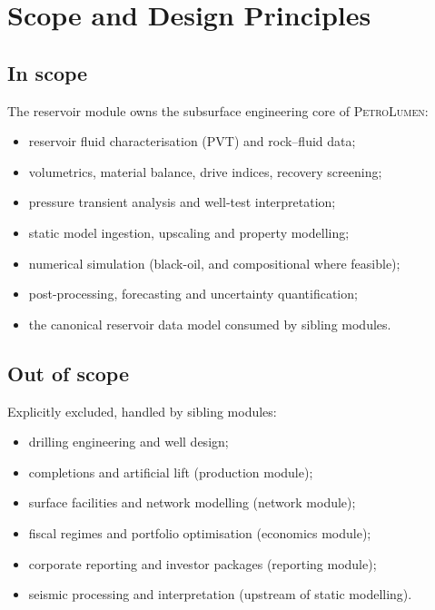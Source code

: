 \documentclass[11pt,a4paper]{article}
\newcommand{\petro}{\textsc{PetroLumen}}
\begin{document}
\section{Scope and Design Principles}

\subsection{In scope}
The reservoir module owns the subsurface engineering core of \petro:
\begin{itemize}[leftmargin=1.4em]
  \item reservoir fluid characterisation (PVT) and rock--fluid data;
  \item volumetrics, material balance, drive indices, recovery screening;
  \item pressure transient analysis and well-test interpretation;
  \item static model ingestion, upscaling and property modelling;
  \item numerical simulation (black-oil, and compositional where feasible);
  \item post-processing, forecasting and uncertainty quantification;
  \item the canonical reservoir data model consumed by sibling modules.
\end{itemize}

\subsection{Out of scope}
Explicitly excluded, handled by sibling modules:
\begin{itemize}[leftmargin=1.4em]
  \item drilling engineering and well design;
  \item completions and artificial lift (production module);
  \item surface facilities and network modelling (network module);
  \item fiscal regimes and portfolio optimisation (economics module);
  \item corporate reporting and investor packages (reporting module);
  \item seismic processing and interpretation (upstream of static modelling).
\end{itemize}
\end{document}

